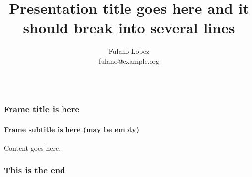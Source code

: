 \documentclass{beamer}
\begin{document}
\title{Presentation title goes here and it should break into several lines}
\author[F.Lopez]{Fulano Lopez \\
fulano@example.org \\~
}


\begin{frame}
    \maketitle
\end{frame}


\begin{frame}[fragile]
    \frametitle{Frame title is here}
    \framesubtitle{Frame subtitle is here (may be empty)}
    Content goes here.
\end{frame}

\begin{frame}[fragile]
\frametitle{This is the end}
\end{frame}
\end{document}
